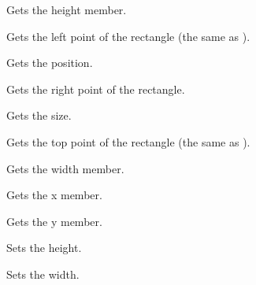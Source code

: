 
Gets the height member.

\label{wxrectgetleft}


Gets the left point of the rectangle (the same as ).

\label{wxrectgetposition}


Gets the position.

\label{wxrectgetright}


Gets the right point of the rectangle.

\label{wxrectgetsize}


Gets the size.

\label{wxrectgettop}


Gets the top point of the rectangle (the same as ).

\label{wxrectgetwidth}


Gets the width member.

\label{wxrectgetx}


Gets the x member.

\label{wxrectgety}


Gets the y member.

\label{wxrectsetheight}


Sets the height.

\label{wxrectsetwidth}


Sets the width.

